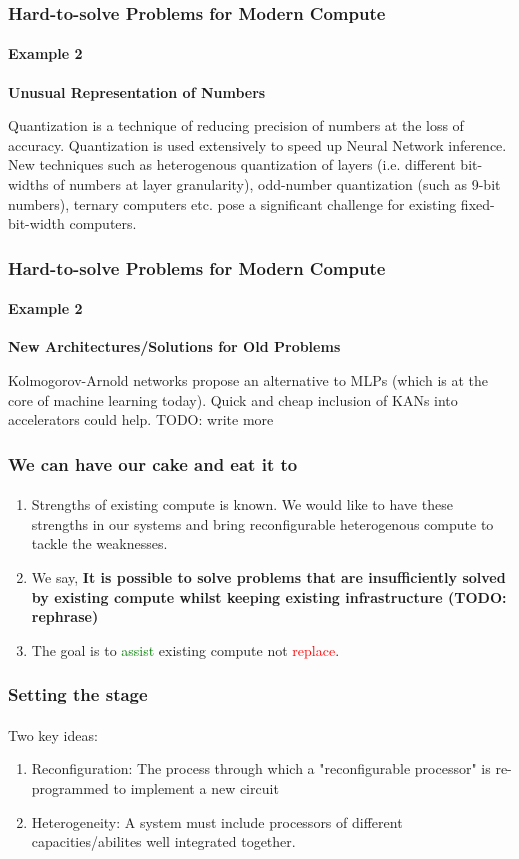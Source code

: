 \documentclass{beamer}
\begin{document}
\begin{frame}[fragile]
  \frametitle{Hard-to-solve Problems for Modern Compute}
  \framesubtitle{Example 2}
  \textbf{Unusual Representation of Numbers}

  Quantization is a technique of reducing precision of numbers at the loss of
  accuracy. Quantization is used extensively to speed up Neural Network
  inference. New techniques such as heterogenous quantization of layers (i.e.
  different bit-widths of numbers at layer granularity), odd-number quantization
  (such as 9-bit numbers), ternary computers etc. pose a significant challenge
  for existing fixed-bit-width computers. 

\end{frame}

\begin{frame}[fragile]
  \frametitle{Hard-to-solve Problems for Modern Compute}
  \framesubtitle{Example 2}
  \textbf{New Architectures/Solutions for Old Problems}

  Kolmogorov-Arnold networks propose an alternative to MLPs (which is
  at the core of machine learning today). Quick and cheap inclusion of KANs into
  accelerators could help. TODO: write more

\end{frame}

\begin{frame}[fragile]
  \frametitle{We can have our cake and eat it to}
  \framesubtitle{}
      \begin{enumerate}
        \item Strengths of existing compute is known. We would like
          to have these strengths in our systems and bring reconfigurable
          heterogenous compute to tackle the weaknesses. 
        \item We say, \textbf{It is possible to solve problems that are
          insufficiently solved by existing compute whilst keeping existing
          infrastructure (TODO: rephrase)}
        \item The goal is to \textcolor{green}{assist} existing compute not
          \textcolor{red}{replace}.
      \end{enumerate}
\end{frame}

\begin{frame}[fragile]
  \frametitle{Setting the stage}
  \framesubtitle{}
    Two key ideas:
      \begin{enumerate}
        \item Reconfiguration: The process through which a "reconfigurable
      processor" is re-programmed to implement a new circuit
        \item Heterogeneity: A system must include processors of different 
          capacities/abilites well integrated together.
      \end{enumerate}
\end{frame}
\end{document}
